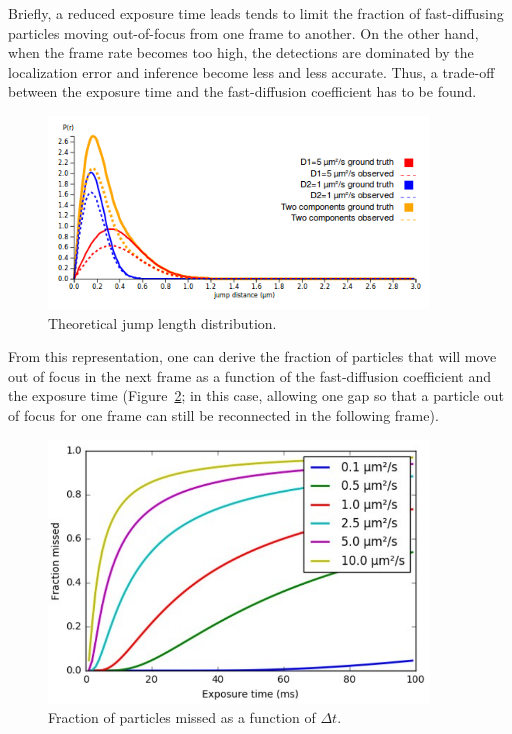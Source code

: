 Briefly, a reduced exposure time leads tends to limit the fraction of fast-diffusing particles moving out-of-focus from one frame to another. On the other hand, when the frame rate becomes too high, the detections are dominated by the localization error and inference become less and less accurate. Thus, a trade-off between the exposure time and the fast-diffusion coefficient has to be found.

\begin{figure}[h]
\centering
\includegraphics[width=0.9\textwidth]{img/interactive_static.png}
\caption{\label{fig:fig3}Theoretical jump length distribution.}
\end{figure}

From this representation, one can derive the fraction of particles that will move out of focus in the next frame as a function of the fast-diffusion coefficient and the exposure time (Figure~\ref{fig:fig4}; in this case, allowing one gap so that a particle out of focus for one frame can still be reconnected in the following frame).

\begin{figure}[h]
\centering
\includegraphics[width=0.9\textwidth]{../SPTGUI/static/SPTGUI/img/fractionmissed.png}
\caption{\label{fig:fig4}Fraction of particles missed as a function of \(\Delta t\).}
\end{figure}

